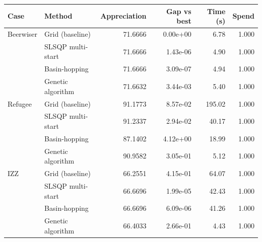 \begin{tabular}{llrrrr}
\toprule
Case & Method & Appreciation & Gap vs best & Time (s) & Spend \\
\midrule
Beerwiser & Grid (baseline) & 71.6666 & 0.00e+00 & 6.78 & 1.000 \\
 & SLSQP multi-start & 71.6666 & 1.43e-06 & 4.90 & 1.000 \\
 & Basin-hopping & 71.6666 & 3.09e-07 & 4.94 & 1.000 \\
 & Genetic algorithm & 71.6632 & 3.44e-03 & 5.40 & 1.000 \\
\addlinespace
Refugee & Grid (baseline) & 91.1773 & 8.57e-02 & 195.02 & 1.000 \\
 & SLSQP multi-start & 91.2337 & 2.94e-02 & 40.17 & 1.000 \\
 & Basin-hopping & 87.1402 & 4.12e+00 & 18.99 & 1.000 \\
 & Genetic algorithm & 90.9582 & 3.05e-01 & 5.12 & 1.000 \\
\addlinespace
IZZ & Grid (baseline) & 66.2551 & 4.15e-01 & 64.07 & 1.000 \\
 & SLSQP multi-start & 66.6696 & 1.99e-05 & 42.43 & 1.000 \\
 & Basin-hopping & 66.6696 & 6.09e-06 & 41.26 & 1.000 \\
 & Genetic algorithm & 66.4033 & 2.66e-01 & 4.43 & 1.000 \\
\bottomrule
\end{tabular}